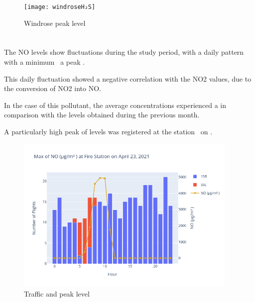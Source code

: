 \documentclass[12pt, oneside]{book}
\begin{document}
{\begin{figure}[H]
\centering
\texttt{[image: windroseH₂S]}
\caption{Windrose  peak level}\label{windroseH2S}
\end{figure}}{}

\section{}


The NO levels show fluctuations during the study period, with a daily pattern with a minimum \minDailyNO\ a peak \maxDailyNO.

This daily fluctuation showed a negative correlation with the NO2 values, due to the conversion of NO2 into NO.

In the case of this pollutant, the average concentrations experienced a \monthChangeNO in comparison with the levels obtained during the previous month.


A particularly high peak of  levels was registered at the station \stationMaxNO\ on \dayMaxNO.

{\begin{figure}[H]
\centering
\includegraphics[width=0.95\textwidth, keepaspectratio]{image18}
\caption{Traffic and  peak level}\label{image18}
\end{figure}}{}
\end{document}
